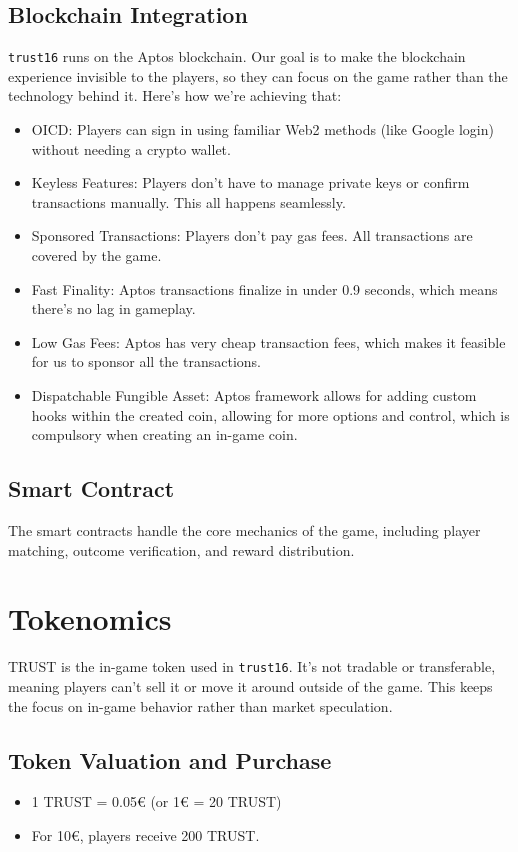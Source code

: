 \documentclass[table, twocolumn]{article}
\begin{document}
\subsection{Blockchain Integration}
\texttt{trust16} runs on the Aptos blockchain. Our goal is to make the blockchain experience invisible to the players, so they can focus on the game rather than the technology behind it. Here’s how we’re achieving that:

\begin{itemize}
    \item OICD: Players can sign in using familiar Web2 methods (like Google login) without needing a crypto wallet.
    \item Keyless Features: Players don’t have to manage private keys or confirm transactions manually. This all happens seamlessly.
    \item Sponsored Transactions: Players don’t pay gas fees. All transactions are covered by the game.
    \item Fast Finality: Aptos transactions finalize in under 0.9 seconds, which means there’s no lag in gameplay.
    \item Low Gas Fees: Aptos has very cheap transaction fees, which makes it feasible for us to sponsor all the transactions.
    \item Dispatchable Fungible Asset: Aptos framework allows for adding custom hooks within the created coin, allowing for more options and control, which is compulsory when creating an in-game coin.
\end{itemize}

\subsection{Smart Contract}
The smart contracts handle the core mechanics of the game, including player matching, outcome verification, and reward distribution. 

\section{Tokenomics} \label{sec:tokenomics}

TRUST is the in-game token used in \texttt{trust16}. It’s not tradable or transferable, meaning players can’t sell it or move it around outside of the game. This keeps the focus on in-game behavior rather than market speculation.

\subsection{Token Valuation and Purchase}
\begin{itemize}
    \item 1 TRUST = 0.05€ (or 1€ = 20 TRUST)
    \item For 10€, players receive 200 TRUST.
\end{itemize}
\end{document}
